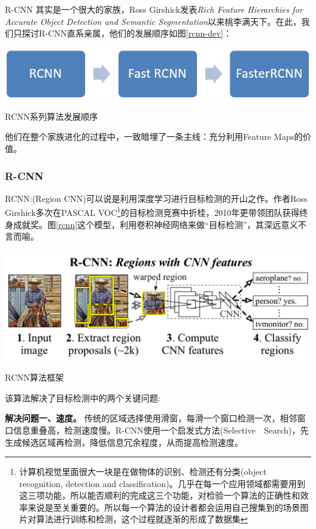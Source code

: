R-CNN 其实是一个很大的家族，Ross Girshick发表\textit{Rich Feature Hierarchies for Accurate Object Detection and Semantic Segmentation}\cite{rcnn}以来桃李满天下。在此，我们只探讨R-CNN直系亲属，他们的发展顺序如图\ref{rcnn-dev}：
\begin{uscfigure}
	\includegraphics[width=\textwidth]{./Pictures/rcnn.jpg}	
	\caption{RCNN系列算法发展顺序}
	\label{rcnn-dev}
\end{uscfigure}

\par \noindent
他们在整个家族进化的过程中，一致暗埋了一条主线：充分利用Feature Maps的价值。

\subsubsection{R-CNN}
RCNN:(Region CNN)\cite{rcnn}可以说是利用深度学习进行目标检测的开山之作。作者Ross Girshick多次在PASCAL VOC\footnote{计算机视觉里面很大一块是在做物体的识别、检测还有分类(object recognition, detection and classification)。几乎在每一个应用领域都需要用到这三项功能，所以能否顺利的完成这三个功能，对检验一个算法的正确性和效率来说是至关重要的。所以每一个算法的设计者都会运用自己搜集到的场景图片对算法进行训练和检测，这个过程就逐渐的形成了数据集}的目标检测竞赛中折桂，2010年更带领团队获得终身成就奖。图\ref{rcnn}这个模型，利用卷积神经网络来做“目标检测”，其深远意义不言而喻。
\begin{uscfigure}
	\includegraphics[width=\textwidth]{./Pictures/rcnn-regions_with_cnn_features.png}	
	\caption{RCNN算法框架}
	\label{rcnn}
\end{uscfigure}
该算法解决了目标检测中的两个关键问题:

\textbf{解决问题一、速度。}
传统的区域选择使用滑窗，每滑一个窗口检测一次，相邻窗口信息重叠高，检测速度慢。R-CNN使用一个启发式方法(Selective　Search\cite{ss})，先生成候选区域再检测，降低信息冗余程度，从而提高检测速度。

